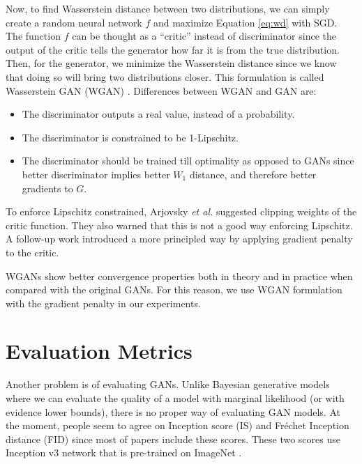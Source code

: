 \documentclass[a4paper,onesided,12pt]{report}
\begin{document}
Now, to find Wasserstein distance between two distributions, we can simply create a random neural network $f$ and maximize Equation \ref{eq:wd} with SGD. The function $f$ can be thought as a ``critic'' instead of discriminator since the output of the critic tells the generator how far it is from the true distribution. Then, for the generator, we minimize the Wasserstein distance since we know that doing so will bring two distributions closer. This formulation is called Wasserstein GAN (WGAN) \cite{arjovsky2017wasserstein}.  Differences between WGAN and GAN are:
\begin{itemize}
	\item The discriminator outputs a real value, instead of a probability.
	\item The discriminator is constrained to be 1-Lipschitz.
	\item The discriminator should be trained till optimality as opposed to GANs since better discriminator implies better $W_1$ distance, and therefore better gradients to $G$.
\end{itemize}

To enforce Lipschitz constrained, Arjovsky \textit{et al.} \cite{arjovsky2017wasserstein} suggested clipping weights of the critic function. They also warned that this is not a good way enforcing Lipschitz. A follow-up work \cite{gulrajani2017improved} introduced a more principled way by applying gradient penalty to the critic.

WGANs show better convergence properties both in theory and in practice when compared with the original GANs. For this reason, we use WGAN formulation with the gradient penalty \cite{gulrajani2017improved} in our experiments.

\section{Evaluation Metrics}
\label{sec:evaluation}

Another problem is of evaluating GANs. Unlike Bayesian generative models where we can evaluate the quality of a model with marginal likelihood (or with evidence lower bounds), there is no proper way of evaluating GAN models. At the moment, people seem to agree on Inception score (IS) \cite{salimans2016improved} and Fr\'echet Inception distance (FID) \cite{heusel2017gans} since most of papers include these scores. These two scores use Inception v3 network \cite{szegedy2016rethinking} that is pre-trained on ImageNet \cite{deng2009imagenet}.
\end{document}
